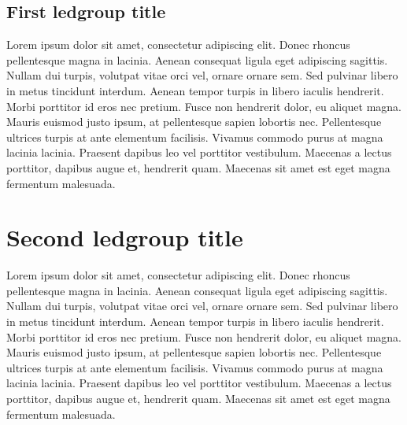 \documentclass[12pt, a4paper]{book}
\begin{document}
\begin{pages}
\begin{Rightside}
      \beginnumbering
     \pstart
       \subsection{First ledgroup title}
     \pend
      \pstart
\begin{ledgroup}\skipnumbering
           Lorem ipsum dolor sit amet, consectetur adipiscing elit. Donec rhoncus pellentesque magna in lacinia. Aenean consequat ligula eget adipiscing sagittis. Nullam dui turpis, volutpat vitae orci vel, ornare ornare sem. Sed pulvinar libero in metus tincidunt interdum. Aenean tempor turpis in libero iaculis hendrerit. Morbi porttitor id eros nec pretium. Fusce non hendrerit dolor, eu aliquet magna. Mauris euismod justo ipsum, at pellentesque sapien lobortis nec. Pellentesque ultrices turpis at ante elementum facilisis. Vivamus commodo purus at magna lacinia lacinia. Praesent dapibus leo vel porttitor vestibulum. Maecenas a lectus porttitor, dapibus augue et, hendrerit quam. Maecenas sit amet est eget magna fermentum malesuada.
        
        \end{ledgroup}
      
      \pend
     \pstart
     \section{Second ledgroup title}
     \pend
      \pstart
\begin{ledgroup}\skipnumbering
           Lorem ipsum dolor sit amet, consectetur adipiscing elit. Donec rhoncus pellentesque magna in lacinia. Aenean consequat ligula eget adipiscing sagittis. Nullam dui turpis, volutpat vitae orci vel, ornare ornare sem. Sed pulvinar libero in metus tincidunt interdum. Aenean tempor turpis in libero iaculis hendrerit. Morbi porttitor id eros nec pretium. Fusce non hendrerit dolor, eu aliquet magna. Mauris euismod justo ipsum, at pellentesque sapien lobortis nec. Pellentesque ultrices turpis at ante elementum facilisis. Vivamus commodo purus at magna lacinia lacinia. Praesent dapibus leo vel porttitor vestibulum. Maecenas a lectus porttitor, dapibus augue et, hendrerit quam. Maecenas sit amet est eget magna fermentum malesuada.
        \end{ledgroup}
      \pend
      \endnumbering
\end{Rightside}
\Pages
\end{pages}
\end{document}
